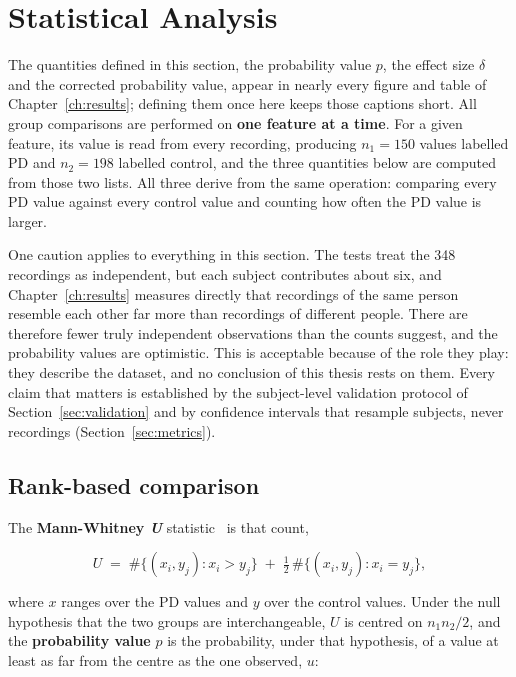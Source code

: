 \section{Statistical Analysis}
\label{sec:stats}

The quantities defined in this section, the probability value $p$, the
effect size $\delta$ and the corrected probability value, appear in nearly
every figure and table of Chapter~\ref{ch:results}; defining them once here
keeps those captions short. All group comparisons are performed on
\textbf{one feature at a time}. For a given feature, its value is read from
every recording, producing $n_1 = 150$ values labelled PD and $n_2 = 198$
labelled control, and the three quantities below are computed from those two
lists. All three derive from the same operation: comparing every PD value
against every control value and counting how often the PD value is larger.

One caution applies to everything in this section. The tests treat the 348
recordings as independent, but each subject contributes about six, and
Chapter~\ref{ch:results} measures directly that recordings of the same
person resemble each other far more than recordings of different people.
There are therefore fewer truly independent observations than the counts
suggest, and the probability values are optimistic. This is acceptable
because of the role they play: they describe the dataset, and no conclusion
of this thesis rests on them. Every claim that matters is established by the
subject-level validation protocol of Section~\ref{sec:validation} and by
confidence intervals that resample subjects, never recordings
(Section~\ref{sec:metrics}).

\subsection{Rank-based comparison}

The \textbf{Mann-Whitney \textit{U}} statistic~\cite{mannwhitney1947} is that
count,

\begin{equation}
  U \;=\; \#\{(x_i, y_j) : x_i > y_j\} \;+\; \tfrac{1}{2}\,\#\{(x_i, y_j) : x_i = y_j\},
  \label{eq:mwu}
\end{equation}

\noindent where $x$ ranges over the PD values and $y$ over the control values.
Under the null hypothesis that the two groups are interchangeable, $U$ is
centred on $n_1 n_2 / 2$, and the \textbf{probability value} $p$ is the
probability, under that hypothesis, of a value at least as far from the centre
as the one observed, $u$:

